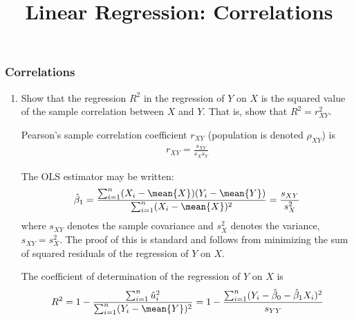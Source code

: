 \title[Correlations]{Linear Regression: Correlations}
\date{}


\def\askone{Show that the regression $R^2$ in the regression of $Y$ on $X$ is the squared value of the sample correlation between $X$ and $Y$. That is, show that $R^2=r^2_{XY}$.}






\begin{frame}[fragile]
\frametitle{Correlations}

\begin{enumerate}\setcounter{enumi}{0}

\item \askone

\begin{answer}
Pearson's sample correlation coefficient $r_{XY}$ (population is denoted $\rho_{XY}$) is
\begin{align*}
r_{XY} 
    = \frac{s_{XY}}{s_{X}s_{Y}}
\end{align*}

The OLS estimator may be written:
\begin{align*}
\hat{\beta}_{1} 
    = \frac{\sum_{i=1}^{n}(X_{i}-\mean{X})(Y_{i}-\mean{Y})}{\sum_{i=1}^{n}(X_{i}-\mean{X})^{2}}
    = \frac{s_{XY}}{s_{X}^2}
\end{align*}
where $s_{XY}$ denotes the sample covariance and $s_{X}^2$ denotes the variance, $s_{XY}=s_{X}^2$. The proof of this is standard and follows from minimizing the sum of squared residuals of the regression of $Y$ on $X$. 
\begin{comment}
If you were expected to show it, I think the question would be more explicit.
It follows that
\begin{align*}
r_{XY} 
    = \frac{s_{X,Y}}{s_{X}s_{Y}}
    = \frac{s_{X,Y}}{s_{X}s_{Y}}\frac{s_{X}}{s_{X}}
    = \frac{s_{X,Y}}{s_{X}^2}\frac{s_{X}}{s_{Y}}
    = \hat{\beta}_{1} \frac{s_{X}}{s_{Y}}
\end{align*}
\end{comment}

The coefficient of determination of the regression of $Y$ on $X$ is
\begin{align*}
R^{2}
  = 1 - \frac{\sum_{i=1}^{n}\hat{u}_{i}^2}{\sum_{i=1}^{n}(Y_{i}-\mean{Y})^2}
  = 1 - \frac{\sum_{i=1}^{n}(Y_{i}-\hat{\beta}_{0}-\hat{\beta}_{1}X_{i})^2}{s_{YY}}
\end{align*}
\end{answer}

\end{enumerate}
\end{frame}


